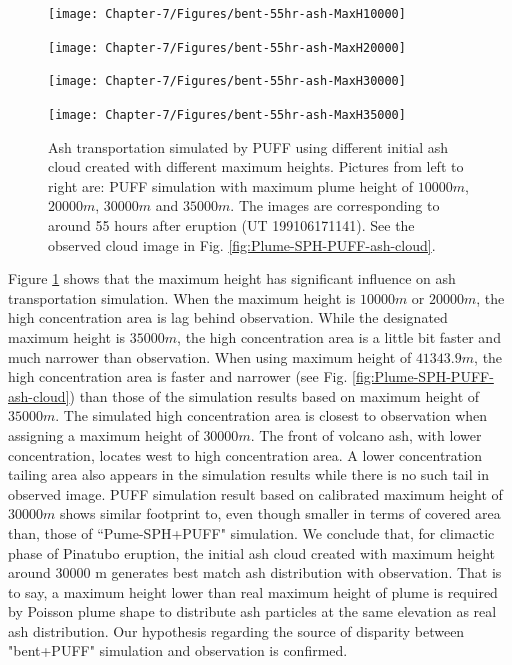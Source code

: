 \begin{figure}[!htb]
    \centering
    \begin{minipage}{.245\textwidth}
        \centering
        \texttt{[image: Chapter-7/Figures/bent-55hr-ash-MaxH10000]}
    \end{minipage}%
    \begin{minipage}{.245 \textwidth}
        \centering
        \texttt{[image: Chapter-7/Figures/bent-55hr-ash-MaxH20000]}
    \end{minipage}%
    \begin{minipage}{.245 \textwidth}
        \centering
        \texttt{[image: Chapter-7/Figures/bent-55hr-ash-MaxH30000]}
    \end{minipage}%
    \begin{minipage}{.245 \textwidth}
        \centering
        \texttt{[image: Chapter-7/Figures/bent-55hr-ash-MaxH35000]}
    \end{minipage}%
    \caption{Ash transportation simulated by PUFF using different initial ash cloud created with different maximum heights. Pictures from left to right are: PUFF simulation with maximum plume height of $10000 m$, $20000 m$, $30000 m$ and $35000 m$. The images are corresponding to around 55 hours after eruption (UT 199106171141).  See the observed cloud image in Fig. \ref{fig:Plume-SPH-PUFF-ash-cloud}. }
    \label{fig:Various-Maximum-height-Pinatubo-ash-cloud}
\end{figure}

Figure \ref{fig:Various-Maximum-height-Pinatubo-ash-cloud} shows that the maximum height has significant influence on ash transportation simulation. When the maximum height is $10000 m$ or $20000 m$, the high concentration area is lag behind observation. While the designated maximum height is $35000 m$, the high concentration area is a little bit faster and much narrower than observation. When using maximum height of $41343.9 m$, the high concentration area is faster and narrower (see Fig. \ref{fig:Plume-SPH-PUFF-ash-cloud}) than those of the simulation results based on maximum height of $35000 m$. The simulated high concentration area is closest to observation when assigning a maximum height of $30000 m$. The front of volcano ash, with lower concentration, locates west to high concentration area. A lower concentration tailing area also appears in the simulation results while there is no such tail in observed image. PUFF simulation result based on calibrated maximum height of $30000 m$ shows similar footprint to, even though smaller in terms of covered area than, those of ``Pume-SPH+PUFF" simulation. We conclude that, for climactic phase of Pinatubo eruption, the initial ash cloud created with maximum height around 30000 m generates best match ash distribution with observation. That is to say, a maximum height lower than real maximum height of plume is required by Poisson plume shape to distribute ash particles at the same elevation as real ash distribution. Our hypothesis regarding the source of disparity between "bent+PUFF" simulation and observation is confirmed.

